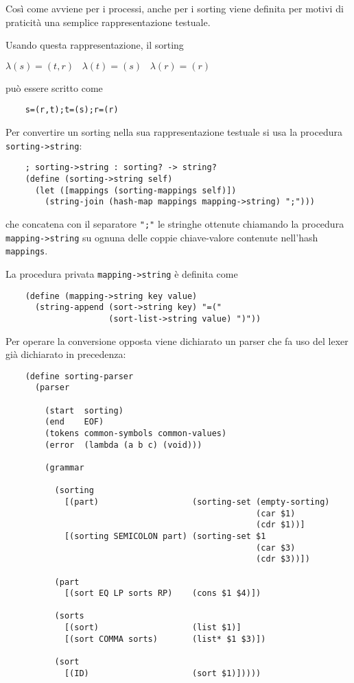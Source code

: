 Cos\`i come avviene per i processi, anche per i sorting viene definita
per motivi di praticit\`a una semplice rappresentazione testuale.

Usando questa rappresentazione, il sorting

\begin{pilisting}
$
    \lambda(s) = (t,r) \;\;\;
    \lambda(t) = (s)   \;\;\;
    \lambda(r) = (r)
$
\end{pilisting}

pu\`o essere scritto come

\lstset{language=C}
\begin{lstlisting}
    s=(r,t);t=(s);r=(r)
\end{lstlisting}
\lstset{language=Racket}

Per convertire un sorting nella sua rappresentazione testuale si usa
la procedura \lstinline{sorting->string}:

\begin{lstlisting}
    ; sorting->string : sorting? -> string?
    (define (sorting->string self)
      (let ([mappings (sorting-mappings self)])
        (string-join (hash-map mappings mapping->string) ";")))
\end{lstlisting}

che concatena con il separatore \lstinline{";"} le stringhe ottenute
chiamando la procedura \lstinline{mapping->string} su ognuna delle
coppie chiave-valore contenute nell'hash \lstinline{mappings}.

La procedura privata \lstinline{mapping->string} \`e definita come

\begin{lstlisting}
    (define (mapping->string key value)
      (string-append (sort->string key) "=("
                     (sort-list->string value) ")"))
\end{lstlisting}

Per operare la conversione opposta viene dichiarato un parser che fa
uso del lexer gi\`a dichiarato in precedenza:

\begin{lstlisting}
    (define sorting-parser
      (parser

        (start  sorting)
        (end    EOF)
        (tokens common-symbols common-values)
        (error  (lambda (a b c) (void)))

        (grammar

          (sorting
            [(part)                   (sorting-set (empty-sorting)
                                                   (car $1)
                                                   (cdr $1))]
            [(sorting SEMICOLON part) (sorting-set $1
                                                   (car $3)
                                                   (cdr $3))])

          (part
            [(sort EQ LP sorts RP)    (cons $1 $4)])

          (sorts
            [(sort)                   (list $1)]
            [(sort COMMA sorts)       (list* $1 $3)])

          (sort
            [(ID)                     (sort $1)]))))
\end{lstlisting}

